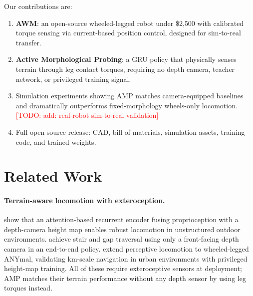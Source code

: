 \documentclass{article}
\newcommand{\todo}[1]{\textcolor{red}{[TODO: #1]}}
\begin{document}
Our contributions are:
\begin{enumerate}
    \item \textbf{AWM}: an open-source wheeled-legged robot under \$2{,}500 with calibrated
    torque sensing via current-based position control, designed for sim-to-real transfer.
    \item \textbf{Active Morphological Probing}: a GRU policy that physically senses
    terrain through leg contact torques, requiring no depth camera, teacher network, or
    privileged training signal.
    \item Simulation experiments showing AMP matches camera-equipped baselines and
    dramatically outperforms fixed-morphology wheels-only locomotion. \todo{add: real-robot
    sim-to-real validation}
    \item Full open-source release: CAD, bill of materials, simulation assets, training
    code, and trained weights.
\end{enumerate}


\section{Related Work}

\paragraph{Terrain-aware locomotion with exteroception.}
\citet{miki2022learning} show that an attention-based recurrent encoder fusing proprioception
with a depth-camera height map enables robust locomotion in unstructured outdoor environments.
\citet{agarwal2022legged} achieve stair and gap traversal using only a front-facing depth
camera in an end-to-end policy. \citet{lee2024wheeled} extend perceptive locomotion to
wheeled-legged ANYmal, validating km-scale navigation in urban environments with privileged
height-map training. All of these require exteroceptive sensors at deployment; AMP matches
their terrain performance without any depth sensor by using leg torques instead.
\end{document}
